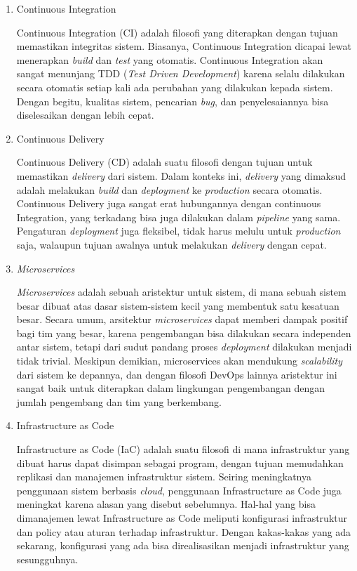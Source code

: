 \begin{enumerate}
  \item Continuous Integration
  
  Continuous Integration (CI) adalah filosofi yang diterapkan dengan tujuan memastikan integritas sistem.
  Biasanya, Continuous Integration dicapai lewat menerapkan \textit{build} dan \textit{test} yang otomatis.
  Continuous Integration akan sangat menunjang TDD (\textit{Test Driven Development}) karena selalu dilakukan secara otomatis setiap kali ada perubahan yang dilakukan kepada sistem.
  Dengan begitu, kualitas sistem, pencarian \textit{bug}, dan penyelesaiannya bisa diselesaikan dengan lebih cepat.

  \item Continuous Delivery
  
  Continuous Delivery (CD) adalah suatu filosofi dengan tujuan untuk memastikan \textit{delivery} dari sistem.
  Dalam konteks ini, \textit{delivery} yang dimaksud adalah melakukan \textit{build} dan \textit{deployment} ke \textit{production} secara otomatis.
  Continuous Delivery juga sangat erat hubungannya dengan continuous Integration, yang terkadang bisa juga dilakukan dalam \textit{pipeline} yang sama.
  Pengaturan \textit{deployment} juga fleksibel, tidak harus melulu untuk \textit{production} saja, walaupun tujuan awalnya untuk melakukan \textit{delivery} dengan cepat.

  \item \textit{Microservices}
  
  \textit{Microservices} adalah sebuah aristektur untuk sistem, di mana sebuah sistem besar dibuat atas dasar sistem-sistem kecil yang membentuk satu kesatuan besar.
  Secara umum, arsitektur \textit{microservices} dapat memberi dampak positif bagi tim yang besar, karena pengembangan bisa dilakukan secara independen antar sistem, tetapi dari sudut pandang proses \textit{deployment} dilakukan menjadi tidak trivial.
  Meskipun demikian, microservices akan mendukung \textit{scalability} dari sistem ke depannya, dan dengan filosofi DevOps lainnya aristektur ini sangat baik untuk diterapkan dalam lingkungan pengembangan dengan jumlah pengembang dan tim yang berkembang.

  \item Infrastructure as Code
  
  Infrastructure as Code (IaC) adalah suatu filosofi di mana infrastruktur yang dibuat harus dapat disimpan sebagai program, dengan tujuan memudahkan replikasi dan manajemen infrastruktur sistem.
  Seiring meningkatnya penggunaan sistem berbasis \textit{cloud}, penggunaan Infrastructure as Code juga meningkat karena alasan yang disebut sebelumnya.
  Hal-hal yang bisa dimanajemen lewat Infrastructure as Code meliputi konfigurasi infrastruktur dan policy atau aturan terhadap infrastruktur.
  Dengan kakas-kakas yang ada sekarang, konfigurasi yang ada bisa direalisasikan menjadi infrastruktur yang sesungguhnya.


\end{enumerate}
